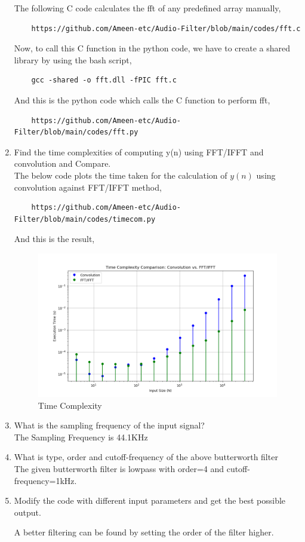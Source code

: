 \documentclass[journal,12pt,twocolumn]{IEEEtran}
\theoremstyle{remark}
\begin{document}
\begin{enumerate}[label=\thesection.\arabic*]
The following C code calculates the fft of any predefined array manually,
\begin{lstlisting}
    https://github.com/Ameen-etc/Audio-Filter/blob/main/codes/fft.c
\end{lstlisting}
Now, to call this C function in the python code, we have to create a shared library by using the bash script,
\begin{lstlisting}
    gcc -shared -o fft.dll -fPIC fft.c
\end{lstlisting}
And this is the python code which calls the C function to perform fft,
\begin{lstlisting}
    https://github.com/Ameen-etc/Audio-Filter/blob/main/codes/fft.py
\end{lstlisting}
\vspace{1cm}
\item Find the time complexities of computing y(n)
using FFT/IFFT and convolution and Compare.\\
The below code plots the time taken for the calculation of $y(n)$ using convolution against FFT/IFFT method,
\begin{lstlisting}
    https://github.com/Ameen-etc/Audio-Filter/blob/main/codes/timecom.py
\end{lstlisting}
And this is the result,
\begin{figure}[h!]
    \centering
    \includegraphics[width=\columnwidth]{figs/timecom.png}
    \caption{Time Complexity}
    \label{fig:enter-label}
\end{figure}
\item What is the sampling frequency of the input signal?\\
\solution The Sampling Frequency is 44.1KHz
\item
What is type, order and  cutoff-frequency of the above butterworth filter
\\
\solution The given butterworth filter is lowpass with order=4 and cutoff-frequency=1kHz.

\item
Modify the code with different input parameters and get the best possible output.

\solution
A better filtering can be found by setting the order of the filter higher.
\end{enumerate}
\end{document}
